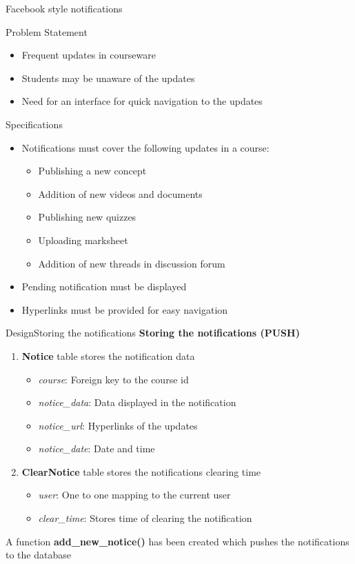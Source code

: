 \documentclass[xcolor=table]{beamer}
\begin{document}
\begin{frame}{Facebook style notifications}
	\begin{block}{Problem Statement}
	\begin{itemize}
		\item Frequent updates in courseware
		\item Students may be unaware of the updates
		\item Need for an interface for quick navigation to the updates
	\end{itemize}
	\end{block}
\end{frame}

\begin{frame}{Specifications}
	\begin{itemize}
		\item Notifications must cover the following updates in a course:
		\begin{itemize}
			\item Publishing a new concept
			\item Addition of new videos and documents
			\item Publishing new quizzes
			\item Uploading marksheet
			\item Addition of new threads in discussion forum
		\end{itemize}
		\item Pending notification must be displayed
		\item Hyperlinks must be provided for easy navigation
	\end{itemize}
\end{frame}

\begin{frame}{Design}{Storing the notifications}
	\textbf{Storing the notifications (PUSH)}
	\begin{enumerate}
		\item \textbf{Notice} table stores the notification data
		\begin{itemize}
			\item \textit{course}: Foreign key to the course id
			\item \textit{notice\_data}: Data displayed in the notification
			\item \textit{notice\_url}: Hyperlinks of the updates
			\item \textit{notice\_date}: Date and time
		\end{itemize}
		\item \textbf{ClearNotice} table stores the notifications clearing time
		\begin{itemize}
			\item \textit{user}: One to one mapping to the current user
			\item \textit{clear\_time}: Stores time of clearing the notification
		\end{itemize}
	\end{enumerate}
	\vspace{0.2in}
	A function \textbf{add\_new\_notice()} has been created which pushes the notifications to the database
\end{frame}
\end{document}
